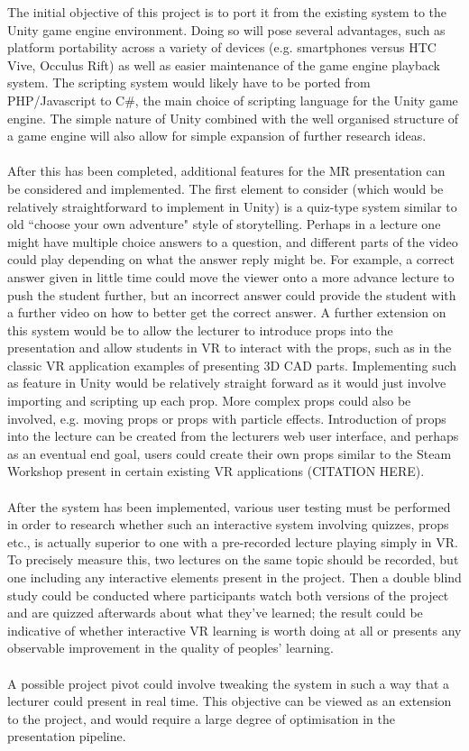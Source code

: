 \documentclass[11pt]{report}
\begin{document}
The initial objective of this project is to port it from the existing system to the Unity game engine environment. Doing so will pose several advantages, such as platform portability across a variety of devices (e.g. smartphones versus HTC Vive, Occulus Rift) as well as easier maintenance of the game engine playback system. The scripting system would likely have to be ported from PHP/Javascript to C\#, the main choice of scripting language for the Unity game engine. The simple nature of Unity combined with the well organised structure of a game engine will also allow for simple expansion of further research ideas.\\~\\
After this has been completed, additional features for the MR presentation can be considered and implemented. The first element to consider (which would be relatively straightforward to implement in Unity) is a quiz-type system similar to old ``choose your own adventure" style of storytelling. Perhaps in a lecture one might have multiple choice answers to a question, and different parts of the video could play depending on what the answer reply might be. For example, a correct answer given in little time could move the viewer onto a more advance lecture to push the student further, but an incorrect answer could provide the student with a further video on how to better get the correct answer. A further extension on this system would be to allow the lecturer to introduce props into the presentation and allow students in VR to interact with the props, such as in the classic VR application examples of presenting 3D CAD parts. Implementing such as feature in Unity would be relatively straight forward as it would just involve importing and scripting up each prop. More complex props could also be involved, e.g. moving props or props with particle effects. Introduction of props into the lecture can be created from the lecturers web user interface, and perhaps as an eventual end goal, users could create their own props similar to the Steam Workshop present in certain existing VR applications (CITATION HERE).\\~\\
After the system has been implemented, various user testing must be performed in order to research whether such an interactive system involving quizzes, props etc., is actually superior to one with a pre-recorded lecture playing simply in VR. To precisely measure this, two lectures on the same topic should be recorded, but one including any interactive elements present in the project. Then a double blind study could be conducted where participants watch both versions of the project and are quizzed afterwards about what they've learned; the result could be indicative of whether interactive VR learning is worth doing at all or presents any observable improvement in the quality of peoples' learning.\\~\\
A possible project pivot could involve tweaking the system in such a way that a lecturer could present in real time. This objective can be viewed as an extension to the project, and would require a large degree of optimisation in the presentation pipeline. 
\end{document}
